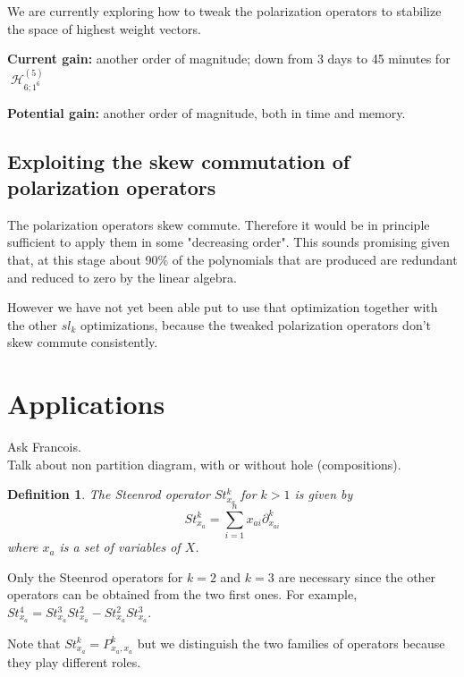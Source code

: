 \documentclass[letter,12pt]{article}
\newcommand{\pauline}[1]{\todo[linecolor=blue,backgroundcolor=blue!25,bordercolor=blue]{#1}}
\DeclareMathOperator{\harmonics}{\mathcal{H}}
\newtheorem{definition}{Definition}
\begin{document}
	We are currently exploring how to tweak the polarization operators to stabilize the space of highest weight vectors.
	
	\textbf{Current gain:} another order of magnitude; down from 3 days to 45 minutes for $\harmonics_{6;1^6}^{(5)}$
	
	\textbf{Potential gain:} another order of magnitude, both in time and memory.
	
	\subsection{Exploiting the skew commutation of polarization operators}
	
	The polarization operators skew commute. Therefore it would be in principle sufficient to apply them in some "decreasing order". This sounds promising given that, at this stage about 90\% of the polynomials that are produced are redundant and reduced to zero by the linear algebra.
	
	However we have not yet been able put to use that optimization together with the other $sl_k$ optimizations, because the tweaked polarization operators don't skew commute consistently.
	
	\section{Applications}
	Ask Francois.\\
	Talk about non partition diagram, with or without hole (compositions). 
	
	\begin{definition} \pauline{Steenrod operators? }
		The \emph{Steenrod operator} $St_{x_a}^k$ for $k>1$ is given by
		$$St_{x_a}^k = \sum_{i=1}^{n} x_{ai} \partial_{x_{ai}}^k$$
		where $x_a$ is a set of variables of $X$. 
	\end{definition}
	
	
	Only the Steenrod operators for $k=2$ and $k=3$ are necessary since the other operators can be obtained from the two first ones. For example, $St_{x_a}^4 = St_{x_a}^3St_{x_a}^2 - St_{x_a}^2St_{x_a}^3$. 
	
	Note that $St_{x_a}^k = P_{x_a,x_a}^k$ but we distinguish the two families of operators because they play different roles. 
	
	

\nocite{*}

\end{document}
